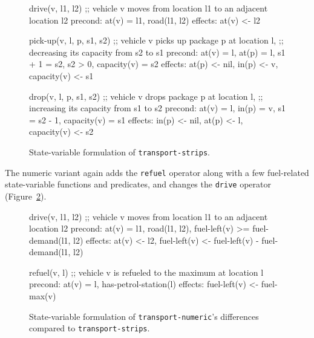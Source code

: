 \begin{figure}[tbp]
\begin{code}
drive(v, l1, l2)
  ;; vehicle v moves from location l1 to an adjacent location l2
  precond: at(v) = l1, road(l1, l2)
  effects: at(v) <- l2

pick-up(v, l, p, s1, s2)
  ;; vehicle v picks up package p at location l,
  ;; decreasing its capacity from s2 to s1
  precond: at(v) = l, at(p) = l, s1 + 1 = s2, s2 > 0, capacity(v) = s2
  effects: at(p) <- nil, in(p) <- v, capacity(v) <- s1
  
drop(v, l, p, s1, s2)
  ;; vehicle v drops package p at location l,
  ;; increasing its capacity from s1 to s2
  precond: at(v) = l, in(p) = v, s1 = s2 - 1, capacity(v) = s1
  effects: in(p) <- nil, at(p) <- l, capacity(v) <- s2
\end{code}
\caption{State-variable formulation of \texttt{transport-strips}.}
\label{code:statevar-strips}
\end{figure}

The numeric variant again adds the \verb+refuel+ operator along with
a few fuel-related state-variable functions and predicates, and changes 
the \verb+drive+ operator (Figure~\ref{code:statevar-numeric}).

\begin{figure}[tb]
\begin{code}
drive(v, l1, l2)
  ;; vehicle v moves from location l1 to an adjacent location l2
  precond: at(v) = l1, road(l1, l2),
           fuel-left(v) >= fuel-demand(l1, l2)
  effects: at(v) <- l2, 
           fuel-left(v) <- fuel-left(v) - fuel-demand(l1, l2)
  
refuel(v, l)
  ;; vehicle v is refueled to the maximum at location l
  precond: at(v) = l, has-petrol-station(l)
  effects: fuel-left(v) <- fuel-max(v)
\end{code}
\caption[Partial state-variable formulation of \texttt{transport-numeric}.]{State-variable formulation of \texttt{transport-numeric}'s differences
compared to \texttt{transport-strips}.}
\label{code:statevar-numeric}
\end{figure}

